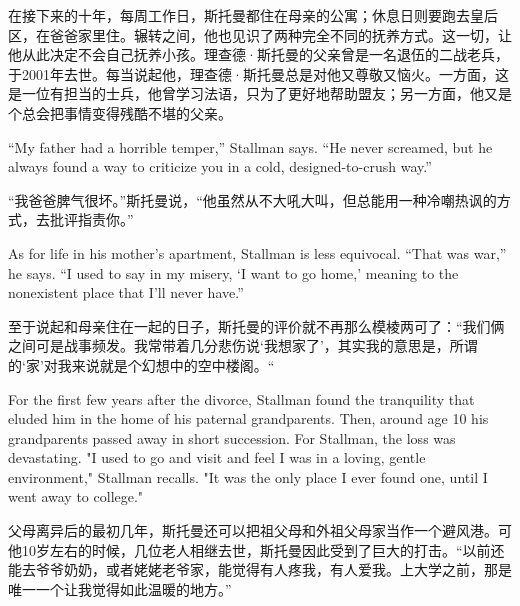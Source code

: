 \ifdefined\chs
在接下来的十年，每周工作日，斯托曼都住在母亲的公寓；休息日则要跑去皇后区，在爸爸家里住。辗转之间，他也见识了两种完全不同的抚养方式。这一切，让他从此决定不会自己抚养小孩。理查德·斯托曼的父亲曾是一名退伍的二战老兵，于2001年去世。每当说起他，理查德·斯托曼总是对他又尊敬又恼火。一方面，这是一位有担当的士兵，他曾学习法语，只为了更好地帮助盟友；另一方面，他又是个总会把事情变得残酷不堪的父亲。
\fi

\ifdefined\eng
``My father had a horrible temper,'' Stallman says. ``He never screamed, but he always found a way to criticize you in a cold, designed-to-crush way.''
\fi

\ifdefined\chs
``我爸爸脾气很坏。''斯托曼说，``他虽然从不大吼大叫，但总能用一种冷嘲热讽的方式，去批评指责你。''
\fi

\ifdefined\eng
As for life in his mother's apartment, Stallman is less equivocal. ``That was war,'' he says. ``I used to say in my misery, `I want to go home,' meaning to the nonexistent place that I'll never have.''
\fi

\ifdefined\chs
至于说起和母亲住在一起的日子，斯托曼的评价就不再那么模棱两可了：``我们俩之间可是战事频发。我常带着几分悲伤说`我想家了'，其实我的意思是，所谓的`家'对我来说就是个幻想中的空中楼阁。``
\fi

\ifdefined\eng
For the first few years after the divorce, Stallman found the tranquility that eluded him in the home of his paternal grandparents. Then, around age 10 his grandparents passed away in short succession. For Stallman, the loss was devastating. "I used to go and visit and feel I was in a loving, gentle environment," Stallman recalls. "It was the only place I ever found one, until I went away to college."
\fi

\ifdefined\chs
父母离异后的最初几年，斯托曼还可以把祖父母和外祖父母家当作一个避风港。可他10岁左右的时候，几位老人相继去世，斯托曼因此受到了巨大的打击。``以前还能去爷爷奶奶，或者姥姥老爷家，能觉得有人疼我，有人爱我。上大学之前，那是唯一一个让我觉得如此温暖的地方。''
\fi

